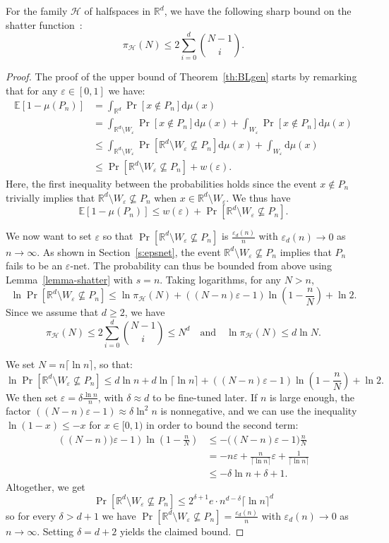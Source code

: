 \documentclass[10pt]{amsart}
\theoremstyle{definition}\newtheorem{defi}[theo]{Definition}\newtheorem{rema}[theo]{Remark}\newtheorem{exam}[theo]{Example}\newtheorem{exem}[theo]{Example}\newtheorem{nota}[theo]{Notation}
\newcommand*{\dd}{\mathrm{d}}
\newcommand{\eps}{\varepsilon}
\newcommand{\Rbb}{\mathbb{R}}%
\newcommand{\Ebb}{\mathbb{E}}%
\newcommand{\Hcal}{\mathcal{H}} %
\newcommand{\pth}[1]{\left(#1 \right)}
\newcommand{\ptb}[1]{\left[#1 \right]}
\newcommand*{\mtfrac}[2]{\frac{#1}{#2}}%
\begin{document}
For the family $\Hcal$ of halfspaces in $\Rbb^d$, we have the following sharp bound on the shatter function~\cite{Harding}:
\[
\pi_{\Hcal}(N)\le 2\sum_{i=0}^{d} \binom{N-1}i.
\]
\begin{proof}
The proof of the upper bound of Theorem~\ref{th:BLgen} starts by remarking that for any $\eps \in [0,1]$ we have:
\begin{align*}
\Ebb\ptb{1-\mu(P_n)} & = \int_{\Rbb^d} \Pr[x \notin P_{n}]\dd\mu(x)\\
& = \int_{\Rbb^d \setminus W_\eps} \Pr[x \notin P_{n}]\dd\mu(x) + \int_{W_\eps} \Pr[x \notin P_{n}]\dd\mu(x) \\
& \le \int_{\Rbb^d \setminus W_\eps} \Pr[\Rbb^d \setminus W_\eps \not\subseteq P_{n}]\dd\mu(x) + \int_{W_\eps}\dd\mu(x)\\
& \le \Pr[\Rbb^d \setminus W_\eps \not\subseteq P_{n}] + w(\eps).
\end{align*}
Here, the first inequality between the probabilities holds since the event $x \notin P_{n}$ trivially implies that $\Rbb^d \setminus W_\eps \not\subseteq P_{n}$ when $x\in \Rbb^d \setminus W_\eps$. We thus have
\[
\Ebb\ptb{1-\mu(P_n)} \le w(\eps) + \Pr[\Rbb^d \setminus W_\eps \not\subseteq P_{n}].
\]

We now want to set $\eps$ so that $\Pr[\Rbb^d \setminus W_\eps \not\subseteq P_{n}]$ is $\frac{\eps_d(n)}{n}$ with $\eps_d(n) \to 0$ as $n \to \infty$. As shown in Section~\ref{s:epsnet}, the event $\Rbb^d \setminus W_\eps \not\subseteq P_{n}$ implies that $P_{n}$ fails to be an $\eps$-net. The probability can thus be bounded from above using Lemma~\ref{lemma-shatter} with $s=n$. Taking logarithms, for any $N > n$,
\[
\ln \Pr[\Rbb^d \setminus W_\eps \not\subseteq P_{n}] \le \ln
\pi_{\Hcal}(N) + \pth{(N-n)\eps-1}
\ln \left(1-\mtfrac{n}{N}\right) + \ln 2.
\]
Since we assume that $d\ge 2$, we have
\[
\pi_{\Hcal}(N) \le 2\sum_{i=0}^{d} \binom{N-1}i\le N^d \quad \text{and} \quad \ln\pi_{\Hcal}(N) \le d \ln N.
\]

We set $N = n \lceil \ln n \rceil$, so that:
\[
\ln \Pr[\Rbb^d \setminus W_\eps \not\subseteq P_{n}]\le d \ln n + d\ln \lceil \ln n \rceil+\pth{(N-n)\eps-1}\ln \left(1-\mtfrac{n}{N}\right) + \ln 2.
\]
We then set $\eps = \delta \frac{\ln n}{n}$, with $\delta \approx d$ to be fine-tuned later. If $n$ is large enough, the factor $\pth{{(N-n)\eps-1}}\approx \delta\ln^2 n$ is nonnegative, and we can use the inequality $\ln(1-x) \le -x$ for $x \in [0,1)$ in order to bound the second term:
\begin{align*}
\pth{(N-n))\eps-1} \ln \left(1-\mtfrac{n}{N}\right) &\le- \bigl({(N-n)\eps-1}\bigr)\frac{n}{N}\\
& = -n\eps +\frac{n}{\lceil \ln n \rceil}\eps +\frac1{\lceil \ln n
\rceil} \\
&\le - \delta \ln n +\delta + 1.
\end{align*}
Altogether, we get
\[
\Pr[\Rbb^d \setminus W_\eps \not\subseteq P_{n}] \le 2^{\delta+1}e \cdot n^{d-\delta}\lceil \ln n \rceil^d
\]
so for every $\delta > d+1$ we have $\Pr[\Rbb^d \setminus W_\eps \not\subseteq P_{n}] = \frac{\eps_d(n)}{n}$ with $\eps_d(n) \to 0$ as $n \to \infty$. Setting $\delta=d+2$ yields the claimed bound.
\end{proof}
\end{document}
